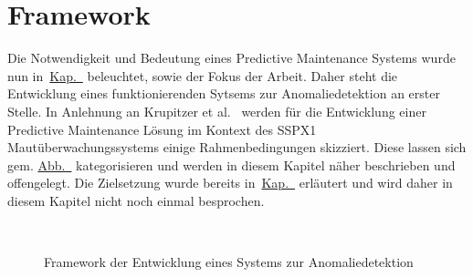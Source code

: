\chapter{Framework}\label{ch:framework}
Die Notwendigkeit und Bedeutung eines Predictive Maintenance Systems wurde nun in~\hyperref[ch:pdm_theorie]{Kap.~}
beleuchtet, sowie der Fokus der Arbeit. Daher steht die Entwicklung eines funktionierenden Sytsems zur Anomaliedetektion an erster Stelle.
In Anlehnung an Krupitzer et al.~\cite{Krupitzer2020} werden für die Entwicklung einer Predictive Maintenance Lösung im Kontext des SSPX1
Mautüberwachungssystems einige Rahmenbedingungen skizziert. Diese lassen sich gem.
\hyperref[fig:pdm_framework]{Abb.~} kategorisieren und werden in diesem Kapitel näher beschrieben und offengelegt.
Die Zielsetzung wurde bereits in~\hyperref[ch:zielsetzung]{Kap.~} erläutert und wird daher in diesem Kapitel nicht
noch einmal besprochen.

\begin{figure}[H]
    \centering
    \caption{Framework der Entwicklung eines Systems zur Anomaliedetektion}
~\label{fig:pdm_framework}
\end{figure}


